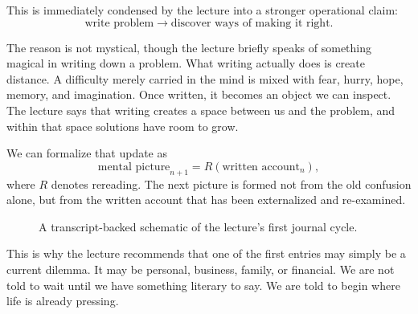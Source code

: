 This is immediately condensed by the lecture into a stronger operational claim:
\begin{equation}
\text{write problem}\rightarrow \text{discover ways of making it right}.
\end{equation}

The reason is not mystical, though the lecture briefly speaks of something magical in writing down a problem. What writing actually does is create distance. A difficulty merely carried in the mind is mixed with fear, hurry, hope, memory, and imagination. Once written, it becomes an object we can inspect. The lecture says that writing creates a space between us and the problem, and within that space solutions have room to grow.

We can formalize that update as
\begin{equation}
\text{mental picture}_{n+1}=R\!\left(\text{written account}_{n}\right),
\end{equation}
where \(R\) denotes rereading. The next picture is formed not from the old confusion alone, but from the written account that has been externalized and re-examined.

\begin{figure}[h]
\centering
{}
\caption{A transcript-backed schematic of the lecture's first journal cycle.}
\end{figure}

This is why the lecture recommends that one of the first entries may simply be a current dilemma. It may be personal, business, family, or financial. We are not told to wait until we have something literary to say. We are told to begin where life is already pressing.

